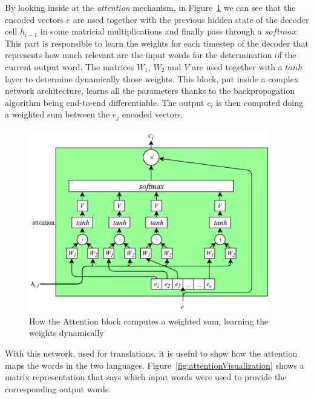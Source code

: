 By looking inside at the \textit{attention} mechanism, in Figure~\ref{fig:attention} we can see that the encoded vectors $e$ are used together with the previous hidden state of the decoder cell $h_{i-1}$ in some matricial multiplications and finally pass through a $softmax$. This part is responsible to learn the weights for each timestep of the decoder that represents how much relevant are the input words for the determination of the current output word. The matrices $W_{1}$, $W_{2}$ and $V$ are used together with a $tanh$ layer to determine dynamically those weights. This block, put inside a complex network architecture, learns all the parameters thanks to the backpropagation algorithm being end-to-end differentiable. The output $c_{i}$ is then computed doing a weighted sum between the $e_{j}$ encoded vectors.

\begin{figure}[!htb]
    \centering
    \includegraphics[max width=0.7\linewidth,max height=8cm,keepaspectratio]{figures/attention}
    \caption{How the Attention block computes a weighted sum, learning the weights dynamically}\label{fig:attention}
\end{figure}

With this network, used for translations, it is useful to show how the attention maps the words in the two languages. Figure~\ref{fig:attentionVisualization} shows a matrix representation that says which input words were used to provide the corresponding output words.

